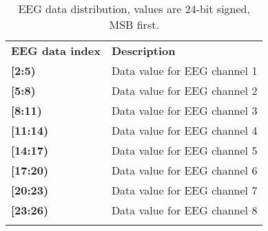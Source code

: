 
\begin{table}
\begin{centering}
\begin{tabular}{>{\raggedleft}m{3cm}>{\raggedright}m{6cm}}
\toprule 
\addlinespace[1em]
\textbf{EEG data index} & \textbf{Description}\tabularnewline\addlinespace[1em]
\midrule
\addlinespace[1em]
\textbf{{[}2:5)} & Data value for EEG channel 1\tabularnewline
\addlinespace[0.5cm]
\textbf{{[}5:8)} & Data value for EEG channel 2\tabularnewline
\addlinespace[0.5cm]
\textbf{{[}8:11)} & Data value for EEG channel 3\tabularnewline
\addlinespace[0.5cm]
\textbf{{[}11:14)} & Data value for EEG channel 4\tabularnewline
\addlinespace[0.5cm]
\textbf{{[}14:17)} & Data value for EEG channel 5\tabularnewline
\addlinespace[0.5cm]
\textbf{{[}17:20)} & Data value for EEG channel 6\tabularnewline
\addlinespace[0.5cm]
\textbf{{[}20:23)} & Data value for EEG channel 7\tabularnewline
\addlinespace[0.5cm]
\textbf{{[}23:26)} & Data value for EEG channel 8\tabularnewline\addlinespace[1em]
\bottomrule
\addlinespace[0.5cm]
\end{tabular}
\par\end{centering}
\caption{EEG data distribution, values are 24-bit signed, MSB first.\label{table:eeg_data_distribution}}
\end{table}


